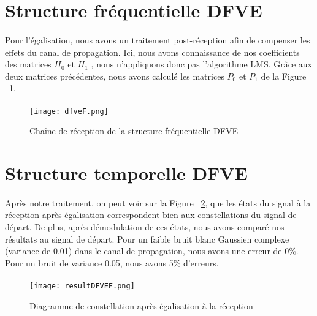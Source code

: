 \section{Structure fréquentielle DFVE}

\paragraph{}
Pour l'égalisation, nous avons un traitement post-réception afin de compenser
les effets du canal de propagation. Ici, nous avons connaissance de nos
coefficients des matrices $H_0$ et $H_1$ \cite{sujet}, nous n'appliquons donc pas
l'algorithme LMS. Grâce aux deux matrices précédentes, nous avons calculé les
matrices $P_0$ et $P_1$ de la Figure ~\ref{dfveF}.

\paragraph{}
\vspace{1\baselineskip}
\begin{figure}[!h]
  \centering
  \texttt{[image: dfveF.png]}
  \caption{Chaîne de réception de la structure fréquentielle DFVE}
	\label{dfveF}
\end{figure}
\vspace{1\baselineskip}
\section{Structure temporelle DFVE}

\paragraph{}
Après notre traitement, on peut voir sur la Figure ~\ref{resultDFVEF}, que les
états du signal à la réception après égalisation correspondent bien aux
constellations du signal de départ. De plus, après démodulation de ces états,
nous avons comparé nos résultats au signal de départ. Pour un faible bruit blanc
Gaussien complexe (variance de 0.01) dans le canal de propagation, nous avons
une erreur de 0\%. Pour un bruit de variance 0.05, nous avons 5\% d'erreurs.

\paragraph{}
\vspace{1\baselineskip}
\begin{figure}[!h]
  \centering
  \texttt{[image: resultDFVEF.png]}
  \caption{Diagramme de constellation après égalisation à la réception}
	\label{resultDFVEF}
\end{figure}
\vspace{1\baselineskip}

